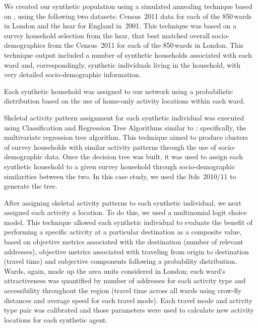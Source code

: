 We created our synthetic population using a simulated annealing technique based on \citet[][]{metropolissampling}, using the following two datasets: Census~2011 data for each of the 850\,wards in London and the \gls{hsar} for England in~2001. This technique was based on a survey household selection from the \gls{hsar}, that best matched overall socio-demographics from the Census~2011 for each of the 850\,wards in London. This technique output included a number of synthetic households associated with each ward and, correspondingly, synthetic individuals living in the household, with very detailed socio-demographic information.

Each synthetic household was assigned to our network using a probabilistic distribution based on the use of home-only activity locations within each ward.

Skeletal activity pattern assignment for each synthetic individual was executed using Classification and Regression Tree Algorithms similar to \citet[][]{SpeckmanEtAl_TechRep_NISS_1998}: specifically, the multivariate regression tree algorithm. 
This technique aimed to produce clusters of survey households with similar activity patterns through the use of socio-demographic data. 
Once the decision tree was built, it was used to assign each synthetic household to a given survey household through socio-demographic similarities between the two. 
In this case study, we used the \gls{ltds}~2010/11 to generate the tree.

After assigning skeletal activity patterns to each synthetic individual, we next assigned each activity a location. 
To do this, we used a multinomial logit choice model. This technique allowed each synthetic individual to evaluate the benefit of performing a specific activity at a particular destination as a composite value, based on objective metrics associated with the destination (\eg number of relevant addresses), objective metrics associated with traveling from origin to destination (\eg travel time) and subjective components following a probability distribution. Wards, again, made up the area units considered in London; each ward's attractiveness was quantified by number of addresses for each activity type and accessibility throughout the region (travel time across all wards using crow-fly distances and average speed for each travel mode). Each travel mode and activity type pair was calibrated and those parameters were used to calculate new activity locations for each synthetic agent.

